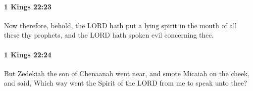 		\paragraph{1 Kings 22:23} %
			\label{1KINGS-22-23}

			Now therefore, behold, the LORD hath put a lying spirit in the mouth of all these thy prophets, and the LORD hath spoken evil concerning thee.


		\paragraph{1 Kings 22:24} %
			\label{1KINGS-22-24}

			But Zedekiah the son of Chenaanah went near, and smote Micaiah on the cheek, and said, Which way went the Spirit of the LORD from me to speak unto thee?



